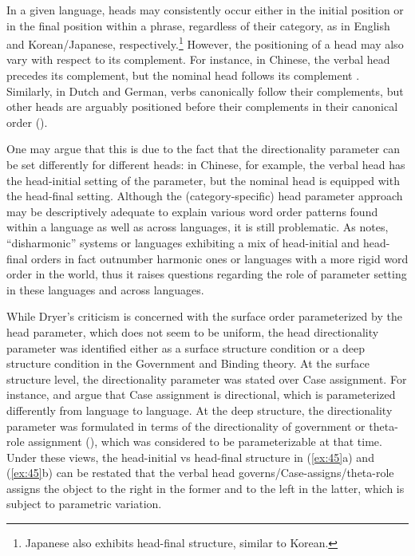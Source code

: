 In a given language, heads may consistently occur either in the initial position or in the final position within a phrase, regardless of their category, as in English and Korean/Japanese, respectively.\footnote{\textrm{Japanese also exhibits head-final structure, similar to Korean.}} However, the positioning of a head may also vary with respect to its complement. For instance, in Chinese, the verbal head precedes its complement, but the nominal head follows its complement \citep{Huang1982}. Similarly, in Dutch and German, verbs canonically follow their complements, but other heads are arguably positioned before their complements in their canonical order (\citealt{Koster1975}). 

One may argue that this is due to the fact that the directionality parameter can be set differently for different heads: in Chinese, for example, the verbal head has the head-initial setting of the parameter, but the nominal head is equipped with the head-final setting. Although the (category-specific) head parameter approach may be descriptively adequate to explain various word order patterns found within a language as well as across languages, it is still problematic. As \citet{Dryer1992} notes, “disharmonic” systems or languages exhibiting a mix of head-initial and head-final orders in fact outnumber harmonic ones or languages with a more rigid word order in the world, thus it raises questions regarding the role of parameter setting in these languages and across languages.

While Dryer’s criticism is concerned with the surface order parameterized by the head parameter, which does not seem to be uniform, the head directionality parameter was identified either as a surface structure condition or a deep structure condition in the Government and Binding theory. At the surface structure level, the directionality parameter was stated over Case assignment. For instance, \citet{Koopman1984} and \citet{Travis1984} argue that Case assignment is directional, which is parameterized differently from language to language. At the deep structure, the directionality parameter was formulated in terms of the directionality of government \citep{Kayne1983} or theta-role assignment (\citealt{Koopman1984,Travis1984}), which was considered to be parameterizable at that time. Under these views, the head-initial vs head-final structure in (\ref{ex:45}a) and (\ref{ex:45}b) can be restated that the verbal head governs/Case-assigns/theta-role assigns the object to the right in the former and to the left in the latter, which is subject to parametric variation. 

